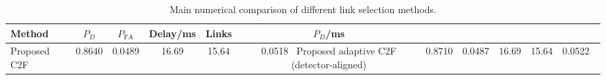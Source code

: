 \begin{table}[t]
    \centering
    \caption{Main numerical comparison of different link selection methods.}
    \label{tab:main_summary}
    \begin{tabular}{l c c c c c}
        \hline
        Method & $P_D$ & $P_{\mathrm{FA}}$ & Delay/ms & Links & $P_D$/ms \\
        \hline
        Proposed C2F & 0.8640 & 0.0489 & 16.69 & 15.64 & 0.0518 \
        Proposed adaptive C2F (detector-aligned) & 0.8710 & 0.0487 & 16.69 & 15.64 & 0.0522 \
        \hline
    \end{tabular}
\end{table}
